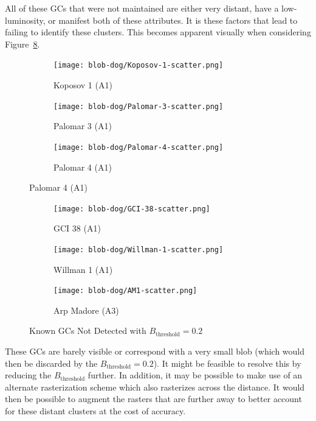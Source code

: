 All of these GCs that were not maintained are either very distant, have a
low-luminosity, or manifest both of these attributes. It is these factors that
lead to \blobdog{} failing to identify these clusters. This becomes apparent
visually when considering Figure~\ref{fig:missing-known-gcs-figure}.
\begin{figure}[H]
    \centering
    \begin{subfigure}[b]{0.32\textwidth}
        \texttt{[image: blob-dog/Koposov-1-scatter.png]}
        \caption{\label{fig:koposov1} Koposov 1 (A1)}
    \end{subfigure}
    \begin{subfigure}[b]{0.32\textwidth}
        \texttt{[image: blob-dog/Palomar-3-scatter.png]}
        \caption{\label{fig:palomar3} Palomar 3 (A1)}
    \end{subfigure}
    \begin{subfigure}[b]{0.32\textwidth}
        \texttt{[image: blob-dog/Palomar-4-scatter.png]}
        \caption{\label{fig:palomar4} Palomar 4 (A1)}
    \end{subfigure}
\end{figure}

\begin{figure}[H]\ContinuedFloat{}
    \centering
    \begin{subfigure}[b]{0.32\textwidth}
        \texttt{[image: blob-dog/GCI-38-scatter.png]}
        \caption{\label{fig:gci38} GCI 38 (A1)}
    \end{subfigure}
    \begin{subfigure}[b]{0.32\textwidth}
        \texttt{[image: blob-dog/Willman-1-scatter.png]}
        \caption{\label{fig:willman1} Willman 1 (A1)}
    \end{subfigure}
    \begin{subfigure}[b]{0.32\textwidth}
        \texttt{[image: blob-dog/AM1-scatter.png]}
        \caption{\label{fig:am1} Arp Madore (A3)}
    \end{subfigure}

    \caption{\label{fig:missing-known-gcs-figure} Known GCs Not Detected with $B_{\text{threshold}} = 0.2$}
\end{figure}
These GCs are barely visible or correspond with a very small blob (which would
then be discarded by the $B_{\text{threshold}} = 0.2$). It might be feasible to
resolve this by reducing the $B_{\text{threshold}}$ further. In addition, it may
be possible to make use of an alternate rasterization scheme which also
rasterizes across the distance. It would then be possible to
augment the rasters that are further away to better account for these distant
clusters at the cost of accuracy.


